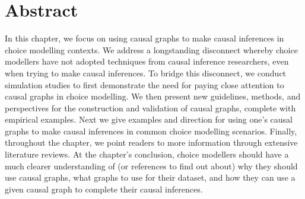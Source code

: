 \section*{Abstract}

In this chapter, we focus on using causal graphs to make causal inferences in choice modelling contexts.
We address a longstanding disconnect whereby choice modellers have not adopted techniques from causal inference researchers, even when trying to make causal inferences.
To bridge this disconnect, we conduct simulation studies to first demonstrate the need for paying close attention to causal graphs in choice modelling.
We then present new guidelines, methods, and perspectives for the construction and validation of causal graphs, complete with empirical examples.
Next we give examples and direction for using one's causal graphs to make causal inferences in common choice modelling scenarios.
Finally, throughout the chapter, we point readers to more information through extensive literature reviews.
At the chapter's conclusion, choice modellers should have a much clearer understanding of (or references to find out about) why they should use causal graphs, what graphs to use for their dataset, and how they can use a given causal graph to complete their causal inferences.
